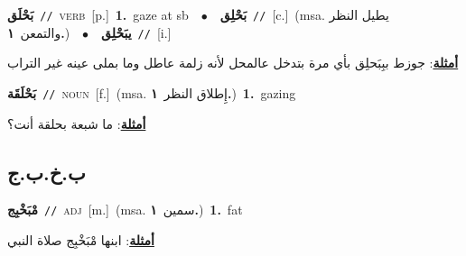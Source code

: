 \documentclass[10pt,a4paper,twoside]{article} %
\begin{document}
\begin{multicols}{2}
{\setlength\topsep{0pt}\textbf{\foreignlanguage{arabic}{بَحْلَق}}\ {\color{gray}\texttt{//}\color{black}}\ \textsc{verb}\ [p.]\ \textbf{1.}~gaze at sb\ \ $\bullet$\ \ \setlength\topsep{0pt}\textbf{\foreignlanguage{arabic}{بَحْلِق}}\ {\color{gray}\texttt{//}\color{black}}\ [c.]\ \color{gray}(msa. \foreignlanguage{arabic}{يطيل النظر والتمعن}~\foreignlanguage{arabic}{\textbf{١.}})\color{black}\ \ $\bullet$\ \ \setlength\topsep{0pt}\textbf{\foreignlanguage{arabic}{يبَحْلِق}}\ {\color{gray}\texttt{//}\color{black}}\ [i.]\  \begin{flushright}\color{gray}\foreignlanguage{arabic}{\textbf{\underline{\foreignlanguage{arabic}{أمثلة}}}: جوزط ببِبَحلِق بأي مرة بتدخل عالمحل لأنه زلمة عاطل وما بملى عينه غير التراب}\end{flushright}\color{black}} \vspace{2mm}

{\setlength\topsep{0pt}\textbf{\foreignlanguage{arabic}{بَحْلَقَة}}\ {\color{gray}\texttt{//}\color{black}}\ \textsc{noun}\ [f.]\ \color{gray}(msa. \foreignlanguage{arabic}{إِطلاق النظر}~\foreignlanguage{arabic}{\textbf{١.}})\color{black}\ \textbf{1.}~gazing\  \begin{flushright}\color{gray}\foreignlanguage{arabic}{\textbf{\underline{\foreignlanguage{arabic}{أمثلة}}}: ما شبعة بحلقة أنت؟}\end{flushright}\color{black}} \vspace{2mm}

\vspace{-3mm}
\subsection*{\color{blue}\foreignlanguage{arabic}{ب.خ.ب.ج}\color{blue}{}} 

{\setlength\topsep{0pt}\textbf{\foreignlanguage{arabic}{مْبَخْبِج}}\ {\color{gray}\texttt{//}\color{black}}\ \textsc{adj}\ [m.]\ \color{gray}(msa. \foreignlanguage{arabic}{سمين}~\foreignlanguage{arabic}{\textbf{١.}})\color{black}\ \textbf{1.}~fat\  \begin{flushright}\color{gray}\foreignlanguage{arabic}{\textbf{\underline{\foreignlanguage{arabic}{أمثلة}}}: ابنها مْبَخْبِج صلاة النبي}\end{flushright}\color{black}} \vspace{2mm}


\end{multicols}
\end{document}
